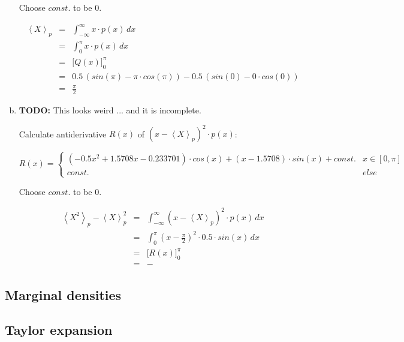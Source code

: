 \documentclass[11pt,a4paper]{article}
\begin{document}
\begin{enumerate}[a)]
Choose $const.$ to be $0$.

\begin{eqnarray*}
\left\langle X \right\rangle_p  &   = & \int_{-\infty}^\infty x \cdot p(x) \, dx\\
                                &   = & \int_0^\pi x \cdot p(x) \, dx\\
                                &   = & \Big[ Q(x) \Big]_0^\pi\\
                                &   = & 0.5 \, (sin(\pi) - \pi \cdot cos(\pi)) - 0.5 \, (sin(0) - 0 \cdot cos(0))\\
                                &   = & \frac{\pi}{2}
\end{eqnarray*}

\item

\textbf{TODO:} This looks weird ... and it is incomplete.

Calculate antiderivative $R(x)$ of $\left( x - \left\langle X \right\rangle_p \right)^2 \cdot p(x)$:

\begin{displaymath}
R(x) = \begin{cases}
(- 0.5 x^2 + 1.5708 x - 0.233701) \cdot cos(x) + (x - 1.5708) \cdot sin(x) + const. & x \in [0, \pi]\\
const.                                                                              & else
\end{cases}
\end{displaymath}

Choose $const.$ to be $0$.

\begin{eqnarray*}
\left\langle X^2 \right\rangle_p - \left\langle X \right\rangle_p^2
&   = & \int_{-\infty}^\infty \left( x - \left\langle X \right\rangle_p \right)^2 \cdot p(x) \, dx\\
&   = & \int_0^\pi \left( x - \frac{\pi}{2} \right)^2 \cdot 0.5 \cdot sin(x) \, dx\\
&   = & \Big[ R(x) \Big]_0^\pi\\
&   = & -
\end{eqnarray*}

\end{enumerate}

\subsection{Marginal densities}

\subsection{Taylor expansion}
\end{document}
